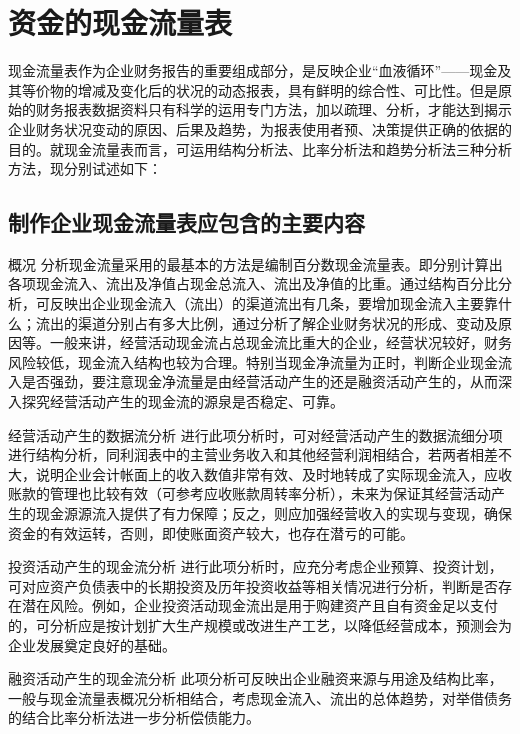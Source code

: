 \section {资金的现金流量表}

    现金流量表作为企业财务报告的重要组成部分，是反映企业“血液循环”——现金及其等价物的增减及变化后的状况的动态报表，具有鲜明的综合性、可比性。但是原始的财务报表数据资料只有科学的运用专门方法，加以疏理、分析，才能达到揭示企业财务状况变动的原因、后果及趋势，为报表使用者预、决策提供正确的依据的目的。就现金流量表而言，可运用结构分析法、比率分析法和趋势分析法三种分析方法，现分别试述如下：

\subsection {制作企业现金流量表应包含的主要内容}

    \begin{enumerate.zh}
        \item  概况 分析现金流量采用的最基本的方法是编制百分数现金流量表。即分别计算出各项现金流入、流出及净值占现金总流入、流出及净值的比重。通过结构百分比分析，可反映出企业现金流入（流出）的渠道流出有几条，要增加现金流入主要靠什么；流出的渠道分别占有多大比例，通过分析了解企业财务状况的形成、变动及原因等。一般来讲，经营活动现金流占总现金流比重大的企业，经营状况较好，财务风险较低，现金流入结构也较为合理。特别当现金净流量为正时，判断企业现金流入是否强劲，要注意现金净流量是由经营活动产生的还是融资活动产生的，从而深入探究经营活动产生的现金流的源泉是否稳定、可靠。

        \item  经营活动产生的数据流分析 进行此项分析时，可对经营活动产生的数据流细分项进行结构分析，同利润表中的主营业务收入和其他经营利润相结合，若两者相差不大，说明企业会计帐面上的收入数值非常有效、及时地转成了实际现金流入，应收账款的管理也比较有效（可参考应收账款周转率分析），未来为保证其经营活动产生的现金源源流入提供了有力保障；反之，则应加强经营收入的实现与变现，确保资金的有效运转，否则，即使账面资产较大，也存在潜亏的可能。

        \item  投资活动产生的现金流分析 进行此项分析时，应充分考虑企业预算、投资计划，可对应资产负债表中的长期投资及历年投资收益等相关情况进行分析，判断是否存在潜在风险。例如，企业投资活动现金流出是用于购建资产且自有资金足以支付的，可分析应是按计划扩大生产规模或改进生产工艺，以降低经营成本，预测会为企业发展奠定良好的基础。

        \item  融资活动产生的现金流分析 此项分析可反映出企业融资来源与用途及结构比率，一般与现金流量表概况分析相结合，考虑现金流入、流出的总体趋势，对举借债务的结合比率分析法进一步分析偿债能力。
    \end{enumerate.zh}

